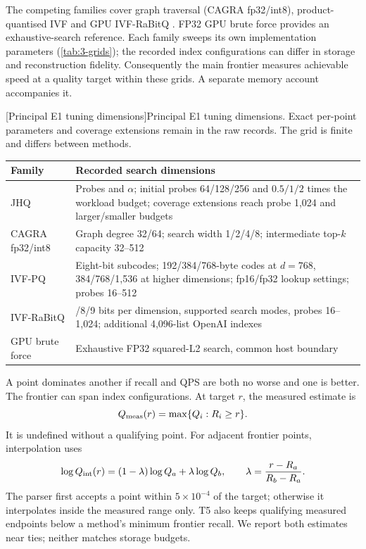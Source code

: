 The competing families cover graph traversal (CAGRA fp32/int8),
product-quantised IVF and GPU IVF-RaBitQ \cite{cagra,pq,ivfrabitq}.
FP32 GPU brute force provides an exhaustive-search reference. Each family
sweeps its own implementation parameters (\cref{tab:3-grids}); the recorded
index configurations can differ in storage and reconstruction fidelity.
Consequently the main frontier measures achievable speed at a quality
target within these grids. A separate memory account accompanies it.

\par\medskip\noindent\begin{minipage}{\linewidth}
\centering\captionsetup{hypcap=false}
[Principal E1 tuning dimensions]{Principal E1 tuning dimensions. Exact per-point parameters and
coverage extensions remain in the raw records. The grid is finite and
differs between methods.}
\label{tab:3-grids}
\footnotesize\setlength{\tabcolsep}{4pt}
\begin{tabularx}{\linewidth}{@{}>{\raggedright\arraybackslash}p{.22\linewidth}>{\raggedright\arraybackslash}X@{}}
\toprule
Family & Recorded search dimensions \\
\midrule
JHQ & Probes and $\alpha$; initial probes 64/128/256 and
$0.5/1/2$ times the workload budget; coverage extensions reach probe
1,024 and larger/smaller budgets \\
CAGRA fp32/int8 & Graph degree 32/64; search width 1/2/4/8;
intermediate top-$k$ capacity 32--512 \\
IVF-PQ & Eight-bit subcodes; 192/384/768-byte codes at $d=768$,
384/768/1,536 at higher dimensions; fp16/fp32 lookup settings;
probes 16--512 \\
IVF-RaBitQ & 4/8/9 bits per dimension, supported search modes,
probes 16--1,024; additional 4,096-list OpenAI indexes \\
GPU brute force & Exhaustive FP32 squared-L2 search, common host boundary \\
\bottomrule
\end{tabularx}
\end{minipage}\par\medskip

A point dominates another if recall and QPS are both no worse and one is better. The frontier can span index configurations. At target $r$, the measured estimate is
\begin{equation}
Q_{\rm meas}(r)=\max\{Q_i:R_i\geq r\}.
\label{eq:3-measured-frontier}
\end{equation}
It is undefined without a qualifying point. For adjacent frontier points, interpolation uses
\begin{equation}
\log Q_{\rm int}(r)=(1-\lambda)\log Q_a+\lambda\log Q_b,
\qquad \lambda=\frac{r-R_a}{R_b-R_a}.
\label{eq:3-interpolated-frontier}
\end{equation}
The parser first accepts a point within $5\times10^{-4}$ of the target; otherwise it interpolates inside the measured range only. T5 also keeps qualifying measured endpoints below a method's minimum frontier recall. We report both estimates near ties; neither matches storage budgets.

